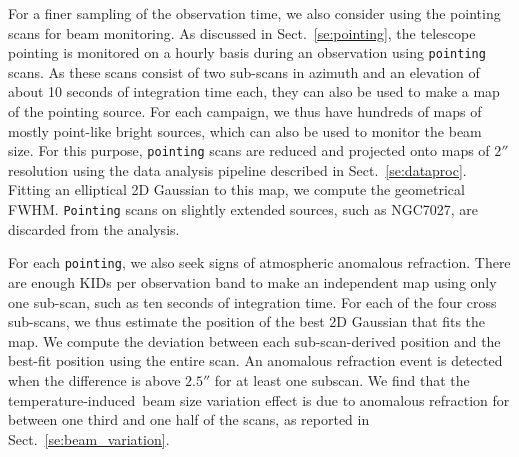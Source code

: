 \documentclass[traditionalabstract]{aa}
\newcommand{\afternoon}{temperature-induced}
\newcommand{\lp}[1]{#1}
\begin{document}
{\begin{appendix}
For a finer sampling of the observation time, we also consider using
the pointing scans for beam monitoring. As discussed in
Sect.~\ref{se:pointing}, the telescope pointing is
monitored on a hourly basis during an observation using {\tt pointing}
scans. As these scans consist of two sub-scans in azimuth and
an elevation of about 10 seconds of integration time each, they
can also be used to make a map of the pointing source. For each campaign,
we thus have hundreds of maps of mostly point-like bright
sources, which can also be used to monitor the beam size. 
For this purpose, {\tt pointing} scans are reduced 
and projected onto maps of $2''$ resolution using
the data analysis pipeline described in Sect.~\ref{se:dataproc}.
Fitting an elliptical 2D Gaussian to this map, we compute the geometrical FWHM. %
{\tt Pointing} scans on {\lp slightly extended} sources, such as NGC7027,
are discarded from the analysis.

For each {\tt pointing}, we also seek signs of atmospheric
anomalous refraction. There are
enough KIDs per observation band to make an independent map using only
one sub-scan, such as ten seconds of integration time.
For each of the four cross sub-scans, we thus estimate the position of the best
2D Gaussian that fits the map. We compute the deviation between each
sub-scan-derived position and the best-fit position using the entire
scan. An anomalous refraction event is detected when the difference is
above $2.5''$ for at least one subscan. We find that the \afternoon\
beam size variation effect is due to anomalous refraction for
between one third and one half of the scans, as reported in
Sect.~\ref{se:beam_variation}.


\end{appendix}}
\end{document}
